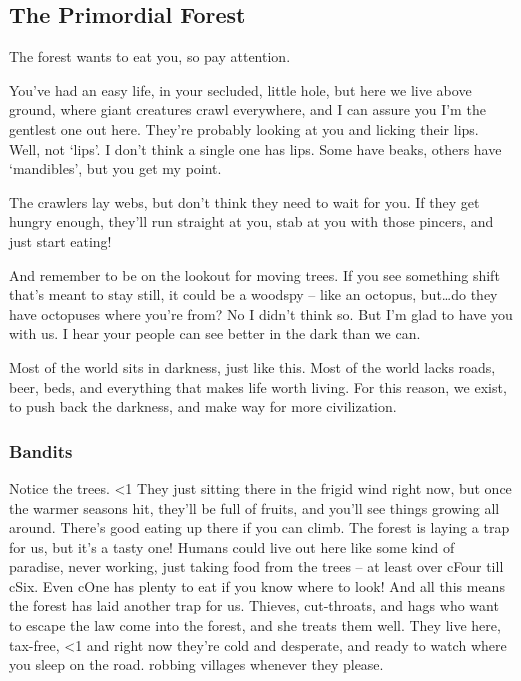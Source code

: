 \begin{multicols}{2}

\subsection*{The Primordial Forest}

\begin{exampletext}

  \noindent
  The forest wants to eat you, so pay attention.

  You've had an easy life, in your secluded, little hole, but here we live above ground, where giant creatures crawl everywhere, and I can assure you I'm the gentlest one out here.
  They're probably looking at you and licking their lips.
Well, not `lips'.
  I don't think a single one has lips.
  Some have beaks, others have `mandibles', but you get my point.

  The \glspl{crawler} lay webs, but don't think they need to wait for you.
  If they get hungry enough, they'll run straight at you, stab at you with those pincers, and just start eating!

  And remember to be on the lookout for moving trees.
  If you see something shift that's meant to stay still, it could be a \gls{woodspy} -- like an octopus, but\ldots do they have octopuses where you're from?
  No I didn't think so.
  But I'm glad to have you with us.
  I hear your people can see better in the dark than we can.

  Most of the world sits in darkness, just like this.
  Most of the world lacks roads, beer, beds, and everything that makes life worth living.
  For this reason, we exist, to push back the darkness, and make way for more civilization.

  \subsubsection*{Bandits}

  Notice the trees.
  \ifnum\value{temperature}<1
    They just sitting there in the frigid wind right now, but once the warmer seasons hit, they'll be full of fruits, and you'll see things growing all around.
  \else
    There's good eating up there if you can climb.
    The forest is laying a trap for us, but it's a tasty one!
  \fi
  Humans could live out here like some kind of paradise, never working, just taking food from the trees -- at least over \gls{cFour} till \gls{cSix}.
  Even \gls{cOne} has plenty to eat if you know where to look!
  And all this means the forest has laid another trap for us.
  Thieves, cut-throats, and hags who want to escape the law come into the forest, and she treats them well.
  They live here, tax-free,
  \ifnum\value{temperature}<1
    and right now they're cold and desperate, and ready to watch where you sleep on the road.
  \else
    robbing \glspl{village} whenever they please.
  \fi


\end{exampletext}
\end{multicols}
